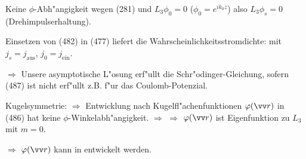 \documentclass[a4paper]{scrartcl}
\begin{document}
Keine $\phi$-Abh"angigkeit wegen (281) und $L_3 \phi_0 = 0$ ($\phi_0 = e^{i k_0 z}$) also $L_3 \phi_s = 0$ (Drehimpulserhaltung).

Einsetzen von (482) in (477) liefert die Wahrscheinlichkeitsstromdichte:
mit $j_s = j_\mathrm{aus}$, $j_0 = j_\mathrm{ein}$.

$\Longrightarrow$
Unsere asymptotische L"osung
erf"ullt die Schr"odinger-Gleichung, sofern
(487) ist nicht erf"ullt z.B. f"ur das Coulomb-Potenzial.

Kugelsymmetrie:
$\Longrightarrow$ Entwicklung nach Kugelfl"achenfunktionen
$\phi(\vv r)$ in (486) hat keine $\phi$-Winkelabh"angigkeit. $\Longrightarrow$
$\Longrightarrow$ $\phi(\vv r)$ ist Eigenfunktion zu $L_3$ mit $m=0$.

$\Longrightarrow$ $\phi(\vv r)$ kann in 
entwickelt werden.
\end{document}
